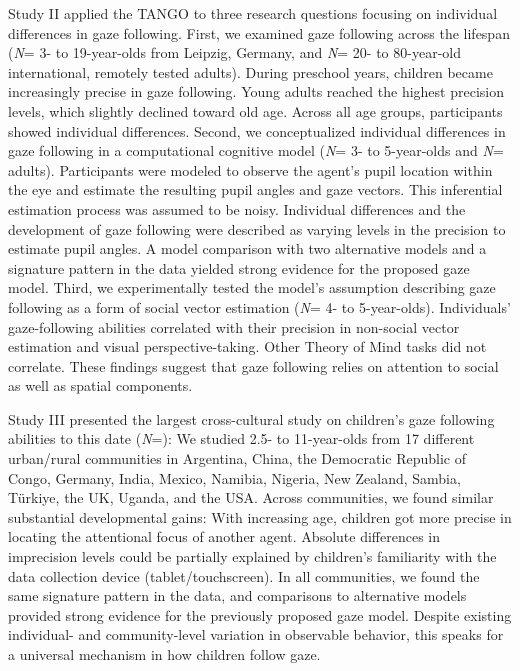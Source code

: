 \documentclass[
]{scrbook}
\begin{document}
Study II applied the TANGO to three research questions focusing on individual differences in gaze following. First, we examined gaze following across the lifespan (\emph{N}\thinspace = 3- to 19-year-olds from Leipzig, Germany, and \emph{N}\thinspace = 20- to 80-year-old international, remotely tested adults). During preschool years, children became increasingly precise in gaze following. Young adults reached the highest precision levels, which slightly declined toward old age. Across all age groups, participants showed individual differences. Second, we conceptualized individual differences in gaze following in a computational cognitive model (\emph{N}\thinspace = 3- to 5-year-olds and \emph{N}\thinspace = adults). Participants were modeled to observe the agent's pupil location within the eye and estimate the resulting pupil angles and gaze vectors. This inferential estimation process was assumed to be noisy. Individual differences and the development of gaze following were described as varying levels in the precision to estimate pupil angles. A model comparison with two alternative models and a signature pattern in the data yielded strong evidence for the proposed gaze model. Third, we experimentally tested the model's assumption describing gaze following as a form of social vector estimation (\emph{N}\thinspace = 4- to 5-year-olds). Individuals' gaze-following abilities correlated with their precision in non-social vector estimation and visual perspective-taking. Other Theory of Mind tasks did not correlate. These findings suggest that gaze following relies on attention to social as well as spatial components.

Study III presented the largest cross-cultural study on children's gaze following abilities to this date (\emph{N}\thinspace =): We studied 2.5- to 11-year-olds from 17 different urban/rural communities in Argentina, China, the Democratic Republic of Congo, Germany, India, Mexico, Namibia, Nigeria, New Zealand, Sambia, Türkiye, the UK, Uganda, and the USA. Across communities, we found similar substantial developmental gains: With increasing age, children got more precise in locating the attentional focus of another agent. Absolute differences in imprecision levels could be partially explained by children's familiarity with the data collection device (tablet/touchscreen). In all communities, we found the same signature pattern in the data, and comparisons to alternative models provided strong evidence for the previously proposed gaze model. Despite existing individual- and community-level variation in observable behavior, this speaks for a universal mechanism in how children follow gaze.
\end{document}
